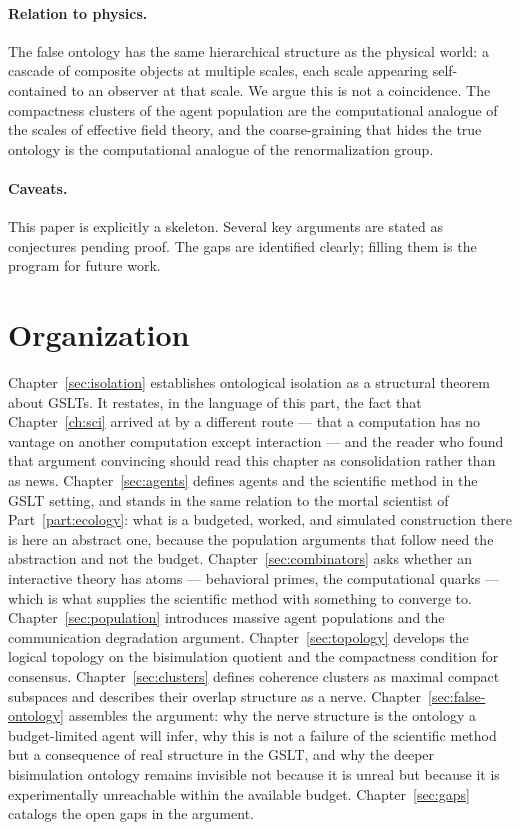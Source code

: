 \paragraph{Relation to physics.}
The false ontology has the same hierarchical structure as the
physical world: a cascade of composite objects at multiple scales,
each scale appearing self-contained to an observer at that scale.
We argue this is not a coincidence.
The compactness clusters of the agent population are the computational
analogue of the scales of effective field theory, and the coarse-graining
that hides the true ontology is the computational analogue of the
renormalization group.

\paragraph{Caveats.}
This paper is explicitly a skeleton.
Several key arguments are stated as conjectures pending proof.
The gaps are identified clearly; filling them is the program for future work.

\section{Organization}

Chapter~\ref{sec:isolation} establishes ontological isolation as a
structural theorem about GSLTs.
It restates, in the language of this part, the fact that
Chapter~\ref{ch:sci} arrived at by a different route --- that a
computation has no vantage on another computation except interaction ---
and the reader who found that argument convincing should read this
chapter as consolidation rather than as news.
Chapter~\ref{sec:agents} defines agents and the scientific method in the
GSLT setting, and stands in the same relation to the mortal scientist of
Part~\ref{part:ecology}: what is a budgeted, worked, and simulated
construction there is here an abstract one, because the population
arguments that follow need the abstraction and not the budget.
Chapter~\ref{sec:combinators} asks whether an interactive theory has
atoms --- behavioral primes, the computational quarks --- which is what
supplies the scientific method with something to converge to.
Chapter~\ref{sec:population} introduces massive agent populations and the
communication degradation argument.
Chapter~\ref{sec:topology} develops the logical topology on the
bisimulation quotient and the compactness condition for consensus.
Chapter~\ref{sec:clusters} defines coherence clusters as maximal compact
subspaces and describes their overlap structure as a nerve.
Chapter~\ref{sec:false-ontology} assembles the argument: why the nerve
structure is the ontology a budget-limited agent will infer, why this is
not a failure of the scientific method but a consequence of real
structure in the GSLT, and why the deeper bisimulation ontology remains
invisible not because it is unreal but because it is experimentally
unreachable within the available budget.
Chapter~\ref{sec:gaps} catalogs the open gaps in the argument.


